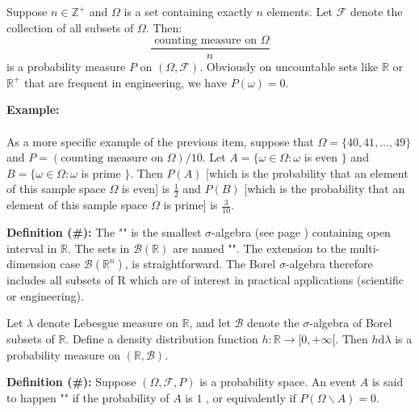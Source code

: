 	Suppose $n \in \mathbb{Z}^{+}$ and $\Omega$ is a set containing exactly $n$ elements. Let $\mathcal{F}$ denote the collection of all subsets of $\Omega$. Then:
	$$\frac{\text { counting measure on } \Omega}{n}$$
	is a probability measure $P$ on $(\Omega, \mathcal{F})$. Obviously on uncountable sets like $\mathbb{R}$ or $\mathbb{R}^+$ that are frequent in engineering, we have $P(\omega)=0$.
	
	\begin{tcolorbox}[colframe=black,colback=white,sharp corners]
    \textbf{{\Large {}}Example:}\\\\
	As a more specific example of the previous item, suppose that $\Omega=\{40,41, \ldots, 49\}$ and $P=(\text{counting measure on } \Omega ) / 10$. Let $A=\{\omega \in \Omega: \omega$ is even $\}$ and $B=\{\omega \in \Omega: \omega$ is prime $\}$. Then $P(A)$ [which is the probability that an element of this sample space $\Omega$ is even] is $\frac{1}{2}$ and $P(B)$ [which is the probability that an element of this sample space $\Omega$ is prime] is $\frac{3}{10}$.
   \end{tcolorbox}

	
	\textbf{Definition (\#\mydef):} The "" is the smallest $\sigma$-algebra (see page \pageref{sigma algebra}) containing open interval in $\mathbb{R}$. The sets in $\mathcal{B}(\mathbb{R})$ are named "". The extension to the multi-dimension case $\mathcal{B}(\mathbb{R}^n)$, is straightforward. The Borel $\sigma$-algebra therefore includes all subsets of R which are of interest in practical applications (scientific or engineering).
	
	Let $\lambda$ denote Lebesgue measure on $\mathbb{R}$, and let $\mathcal{B}$ denote the $\sigma$-algebra of Borel subsets of $\mathbb{R}$. Define a density distribution function $h: \mathbb{R} \rightarrow [0, +\infty[$. Then $h \mathrm{d} \lambda$ is a probability measure on $(\mathbb{R}, \mathcal{B})$.
	
	\textbf{Definition (\#\mydef):} Suppose $(\Omega, \mathcal{F}, P)$ is a probability space. An event $A$ is said to happen "" if the probability of $A$ is $1$ , or equivalently if $P(\Omega \backslash A)=0$.
	
